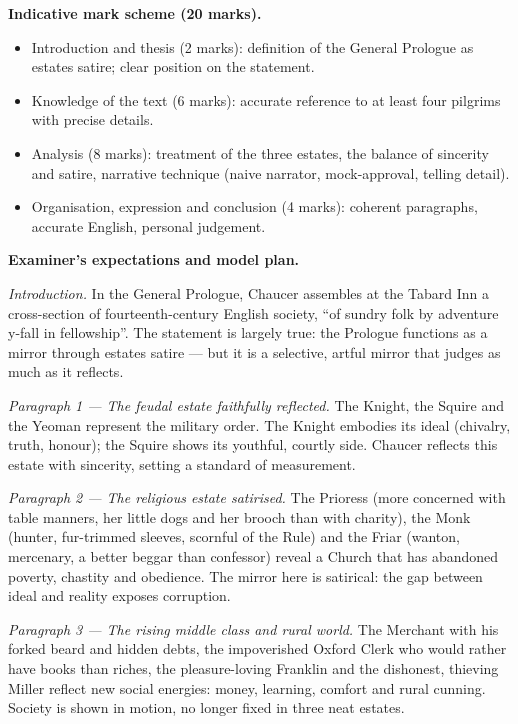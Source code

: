 \documentclass[11pt]{article}
\begin{document}
\begin{corrige}
\textbf{Indicative mark scheme (20 marks).}
\begin{itemize}
\item Introduction and thesis (2 marks): definition of the General Prologue as estates satire; clear position on the statement.
\item Knowledge of the text (6 marks): accurate reference to at least four pilgrims with precise details.
\item Analysis (8 marks): treatment of the three estates, the balance of sincerity and satire, narrative technique (naive narrator, mock-approval, telling detail).
\item Organisation, expression and conclusion (4 marks): coherent paragraphs, accurate English, personal judgement.
\end{itemize}

\textbf{Examiner's expectations and model plan.}

\emph{Introduction.} In the General Prologue, Chaucer assembles at the Tabard Inn a cross-section of fourteenth-century English society, ``of sundry folk by adventure y-fall in fellowship''. The statement is largely true: the Prologue functions as a mirror through estates satire — but it is a selective, artful mirror that judges as much as it reflects.

\emph{Paragraph 1 — The feudal estate faithfully reflected.} The Knight, the Squire and the Yeoman represent the military order. The Knight embodies its ideal (chivalry, truth, honour); the Squire shows its youthful, courtly side. Chaucer reflects this estate with sincerity, setting a standard of measurement.

\emph{Paragraph 2 — The religious estate satirised.} The Prioress (more concerned with table manners, her little dogs and her brooch than with charity), the Monk (hunter, fur-trimmed sleeves, scornful of the Rule) and the Friar (wanton, mercenary, a better beggar than confessor) reveal a Church that has abandoned poverty, chastity and obedience. The mirror here is satirical: the gap between ideal and reality exposes corruption.

\emph{Paragraph 3 — The rising middle class and rural world.} The Merchant with his forked beard and hidden debts, the impoverished Oxford Clerk who would rather have books than riches, the pleasure-loving Franklin and the dishonest, thieving Miller reflect new social energies: money, learning, comfort and rural cunning. Society is shown in motion, no longer fixed in three neat estates.


\end{corrige}
\end{document}
